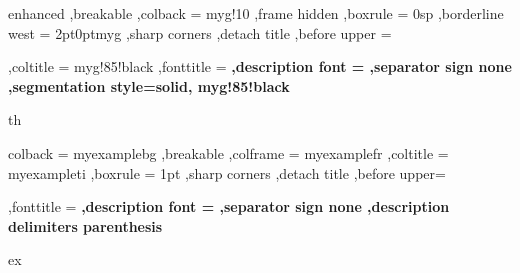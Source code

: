 


{%
	enhanced
	,breakable
	,colback = myg!10
	,frame hidden
	,boxrule = 0sp
	,borderline west = {2pt}{0pt}{myg}
	,sharp corners
	,detach title
	,before upper = \tcbtitle\par\smallskip
	,coltitle = myg!85!black
	,fonttitle = \bfseries\sffamily
	,description font = \mdseries
	,separator sign none
	,segmentation style={solid, myg!85!black}
}
{th}




{%
	colback = myexamplebg
	,breakable
	,colframe = myexamplefr
	,coltitle = myexampleti
	,boxrule = 1pt
	,sharp corners
	,detach title
	,before upper=\tcbtitle\par\smallskip
	,fonttitle = \bfseries
	,description font = \mdseries
	,separator sign none
	,description delimiters parenthesis
}
{ex}



